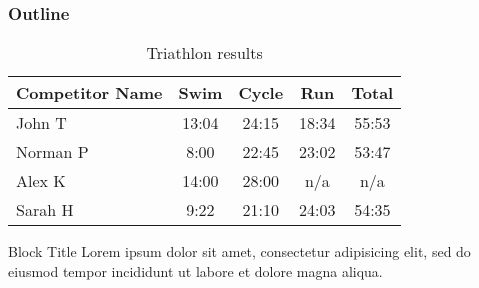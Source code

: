 \begin{frame}
\frametitle{Outline}

\end{frame}


\begin{table}
\begin{tabular}{l | c | c | c | c }
Competitor Name & Swim & Cycle & Run & Total \\
\hline \hline
John T & 13:04 & 24:15 & 18:34 & 55:53 \\ 
Norman P & 8:00 & 22:45 & 23:02 & 53:47\\
Alex K & 14:00 & 28:00 & n/a & n/a\\
Sarah H & 9:22 & 21:10 & 24:03 & 54:35 
\end{tabular}
\caption{Triathlon results}
\end{table}

\begin{alertblock}{Block Title}
Lorem ipsum dolor sit amet, consectetur adipisicing elit, 
sed do eiusmod tempor incididunt ut labore et 
dolore magna aliqua.
\end{alertblock}
